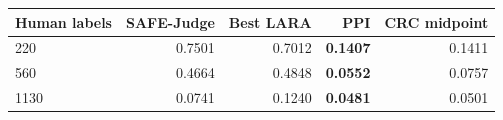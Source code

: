 \begin{tabular}{@{}lrrrr@{}}
\toprule
Human labels & SAFE-Judge & Best LARA & PPI & CRC midpoint \\
\midrule
220 & 0.7501 & 0.7012 & \textbf{0.1407} & 0.1411 \\
560 & 0.4664 & 0.4848 & \textbf{0.0552} & 0.0757 \\
1130 & 0.0741 & 0.1240 & \textbf{0.0481} & 0.0501 \\
\bottomrule
\end{tabular}
